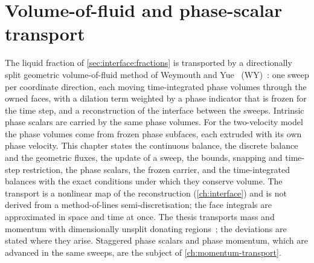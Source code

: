 \chapter{Volume-of-fluid and phase-scalar transport}\label{ch:vof-transport}
The liquid fraction of \cref{sec:interface:fractions} is transported by a
directionally split geometric volume-of-fluid method of Weymouth and
Yue~\cite{weymouth2010} (WY)~: one sweep per coordinate
direction, each moving time-integrated phase volumes through the owned faces,
with a dilation term weighted by a phase indicator that is frozen for the time
step, and a reconstruction of the interface between the sweeps. Intrinsic
phase scalars are carried by the same phase volumes. For the two-velocity
model the phase volumes come from frozen phase subfaces,
each extruded with its own phase velocity. This chapter states the continuous
balance,
the discrete balance and the geometric fluxes, the update of a sweep, the
bounds, snapping and time-step restriction, the phase scalars, the frozen
carrier,
and the time-integrated balances with the exact conditions under which they
conserve volume. The transport is a nonlinear map of the reconstruction
(\cref{ch:interface}) and is not derived from a method-of-lines
semi-discretisation; the face integrals are approximated in space and time at
once. The thesis transports mass and momentum with dimensionally unsplit
donating regions~; the deviations are stated where they
arise. Staggered phase scalars and phase momentum, which are advanced in the
same sweeps, are the subject of \cref{ch:momentum-transport}.

